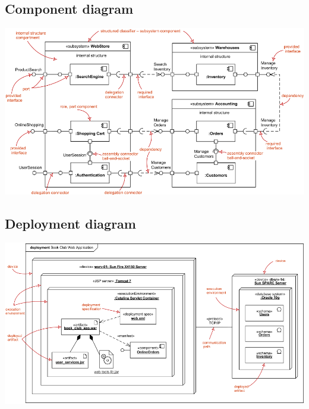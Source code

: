 \subsection{Component diagram}
\includegraphics[angle=90,origin=c,width=0.7\linewidth]{4-uml/component.png}

\subsection{Deployment diagram}
\includegraphics[angle=90,origin=c,width=0.8\linewidth]{4-uml/deployment.png}
